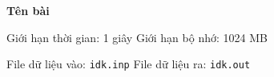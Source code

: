 \documentclass[12pt,a4paper]{article}
\begin{document}
\begin{center}
    {\LARGE\bfseries Tên bài}

    \vspace{0.4em}

    {\small
    Giới hạn thời gian: 1 giây \quad
    Giới hạn bộ nhớ: 1024 MB
    }

    {\small
    File dữ liệu vào: \texttt{idk.inp} \quad
    File dữ liệu ra: \texttt{idk.out}
    }
\end{center}
\end{document}
